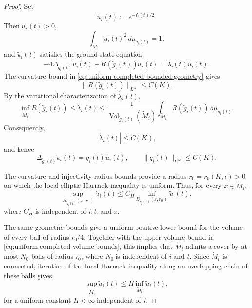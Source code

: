 \documentclass{amsart}
\begin{document}
\begin{proof}
Set
\[
        \widetilde u_i(t)
        :=
        e^{-\widetilde f_i(t)/2}.
\]
Then \(\widetilde u_i(t)>0\),
\[
        \int_{\widetilde M_i}
        \widetilde u_i(t)^2
        \,d\mu_{\widetilde g_i(t)}
        =1,
\]
and \(\widetilde u_i(t)\) satisfies the ground-state equation
\begin{equation}
\label{eq:perelman-ground-state-equation}
        -4\Delta_{\widetilde g_i(t)}
        \widetilde u_i(t)
        +
        R(\widetilde g_i(t))\widetilde u_i(t)
        =
        \widetilde\lambda_i(t)\widetilde u_i(t).
\end{equation}
The curvature bound in
\eqref{eq:uniform-completed-bounded-geometry} gives
\[
        \|R(\widetilde g_i(t))\|_{L^\infty}
        \leq C(K).
\]
By the variational characterization of
\(\widetilde\lambda_i(t)\),
\[
        \inf_{\widetilde M_i}R(\widetilde g_i(t))
        \leq
        \widetilde\lambda_i(t)
        \leq
        \frac{1}{
        \operatorname{Vol}_{\widetilde g_i(t)}(\widetilde M_i)}
        \int_{\widetilde M_i}
        R(\widetilde g_i(t))
        \,d\mu_{\widetilde g_i(t)}.
\]
Consequently,
\[
        |\widetilde\lambda_i(t)|
        \leq C(K),
\]
and hence
\[
        \Delta_{\widetilde g_i(t)}\widetilde u_i(t)
        =
        q_i(t)\widetilde u_i(t),
        \qquad
        \|q_i(t)\|_{L^\infty}
        \leq C(K).
\]

\noindent The curvature and injectivity-radius bounds provide a radius
\(r_0=r_0(K,\iota)>0\) on which the local elliptic Harnack
inequality is uniform. Thus, for every
\(x\in\widetilde M_i\),
\[
        \sup_{B_{\widetilde g_i(t)}(x,r_0)}
        \widetilde u_i(t)
        \leq
        C_H
        \inf_{B_{\widetilde g_i(t)}(x,r_0)}
        \widetilde u_i(t),
\]
where \(C_H\) is independent of \(i,t\), and \(x\).



\noindent The same geometric bounds give a uniform positive lower bound
for the volume of every ball of radius \(r_0/4\). Together with
the upper volume bound in
\eqref{eq:uniform-completed-volume-bounds}, this implies that
\(\widetilde M_i\) admits a cover by at most \(N_0\) balls of
radius \(r_0\), where \(N_0\) is independent of \(i\) and \(t\).
Since \(\widetilde M_i\) is connected, iteration of the local
Harnack inequality along an overlapping chain of these balls
gives
\begin{equation}
\label{eq:global-ground-state-harnack}
        \sup_{\widetilde M_i}\widetilde u_i(t)
        \leq
        H
        \inf_{\widetilde M_i}\widetilde u_i(t),
\end{equation}
for a uniform constant \(H<\infty\) independent of $i$.


\end{proof}
\end{document}
